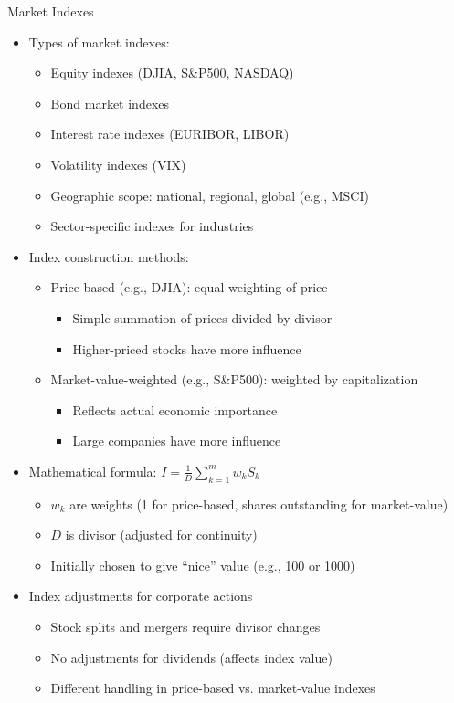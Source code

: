 \documentclass[10pt,handout]{beamer}
\begin{document}
\begin{frame}{Market Indexes}
  \begin{itemize}[<+->]
    \item Types of market indexes:
      \begin{itemize}
        \item Equity indexes (DJIA, S\&P500, NASDAQ)
        \item Bond market indexes
        \item Interest rate indexes (EURIBOR, LIBOR)
        \item Volatility indexes (VIX)
        \item Geographic scope: national, regional, global (e.g., MSCI)
        \item Sector-specific indexes for industries
      \end{itemize}
    \item Index construction methods:
      \begin{itemize}
        \item Price-based (e.g., DJIA): equal weighting of price
          \begin{itemize}
            \item Simple summation of prices divided by divisor
            \item Higher-priced stocks have more influence
          \end{itemize}
        \item Market-value-weighted (e.g., S\&P500): weighted by capitalization
          \begin{itemize}
            \item Reflects actual economic importance
            \item Large companies have more influence
          \end{itemize}
      \end{itemize}
    \item Mathematical formula: $I = \tfrac{1}{D}\sum_{k=1}^{m} w_k S_k$
      \begin{itemize}
        \item $w_k$ are weights (1 for price-based, shares outstanding for market-value)
        \item $D$ is divisor (adjusted for continuity)
        \item Initially chosen to give ``nice'' value (e.g., 100 or 1000)
      \end{itemize}
    \item Index adjustments for corporate actions
      \begin{itemize}
        \item Stock splits and mergers require divisor changes
        \item No adjustments for dividends (affects index value)
        \item Different handling in price-based vs. market-value indexes
      \end{itemize}
  \end{itemize}
\end{frame}
\end{document}

